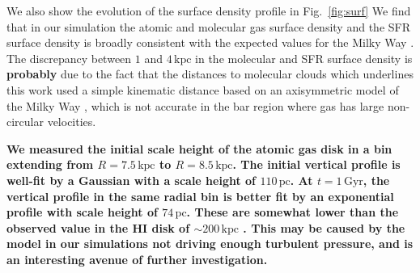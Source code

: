 \documentclass[twocolumn,linenumbers,trackchanges]{aastex631}
\begin{document}
We also show the evolution of the surface density profile in Fig.~\ref{fig:surf}
We find that in our simulation the atomic and molecular gas surface density and
the SFR surface density is broadly consistent with the expected values for the
Milky Way \citep{2008AA...487..951K,2022ApJ...929L..18E}. The discrepancy between
$1$ and $4\,\textrm{kpc}$ in the molecular and SFR surface density is {\bf probably} due
to the fact that the distances to molecular clouds which underlines this work
used a simple kinematic distance based on an axisymmetric model of the Milky
Way \citep{2017ApJ...834...57M}, which is not accurate in the bar region where gas
has large non-circular velocities.

{\bf We measured the initial scale height of the atomic gas disk in a bin
extending from $R=7.5\,\textrm{kpc}$ to $R=8.5\,\textrm{kpc}$. The initial
vertical profile is well-fit by a Gaussian with a scale height of
$110\,\textrm{pc}$. At $t=1\,\textrm{Gyr}$, the vertical profile in the same
radial bin is better fit by an exponential profile with scale height of
$74\,\textrm{pc}$. These are somewhat lower than the observed value in the HI
disk of $\sim200\,\textrm{kpc}$ \citep{1995ApJ...448..138M}. This may be caused
by the model in our simulations not driving enough turbulent pressure, and is an
interesting avenue of further investigation.}
\end{document}
